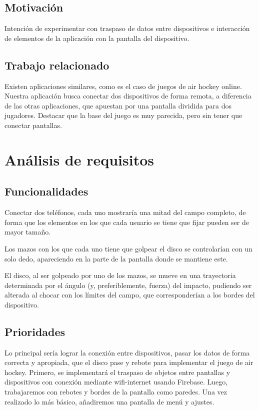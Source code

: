 \documentclass[a4paper,openright,12pt]{article}
\begin{document}
\subsection{Motivación}
Intención de experimentar con traspaso de datos entre dispositivos e interacción de elementos de la aplicación con la pantalla del dispositivo. 
\subsection{Trabajo relacionado}
Existen aplicaciones similares, como es el caso de juegos de air hockey online. Nuestra aplicación busca conectar dos dispositivos de forma remota, a diferencia de las otras aplicaciones, que apuestan por una pantalla dividida para dos jugadores. Destacar que la base del juego es muy parecida, pero sin tener que conectar pantallas.

\section{Análisis de requisitos}

\subsection{Funcionalidades}
Conectar dos teléfonos, cada uno mostraría una mitad del campo completo, de forma que los elementos en los que cada usuario se tiene que fijar pueden ser de mayor tamaño.
 
Los mazos con los que cada uno tiene que golpear el disco se controlarían con un solo dedo, apareciendo en la parte de la pantalla donde se mantiene este.
 
El disco, al ser golpeado por uno de los mazos, se mueve en una trayectoria determinada por el ángulo (y, preferiblemente, fuerza) del impacto, pudiendo ser alterada al chocar con los límites del campo, que corresponderían a los bordes del dispositivo.
\subsection{Prioridades}
Lo principal sería lograr la conexión entre dispositivos, pasar los datos de forma correcta y apropiada, que el disco pase y rebote para implementar el juego de air hockey.
Primero, se implementará el traspaso de objetos entre pantallas y dispositivos con conexión mediante wifi-internet usando Firebase.
Luego, trabajaremos con rebotes y bordes de la pantalla como paredes.
Una vez realizado lo más básico, añadiremos una pantalla de menú y ajustes. 
\end{document}
